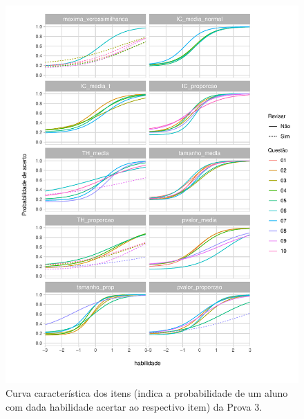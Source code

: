 \documentclass[a4paper]{report}
\begin{document}
\begin{figure}
\centering
\includegraphics{Relatorio_files/figure-latex/unnamed-chunk-8-1.pdf}
\caption{Curva característica dos itens (indica a probabilidade de um
aluno com dada habilidade acertar ao respectivo item) da Prova 3.}
\end{figure}

\newpage
\end{document}

